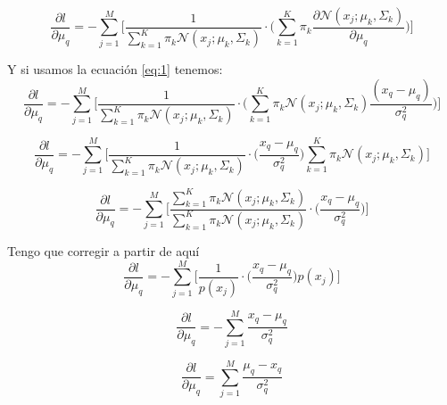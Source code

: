 \documentclass[a5paper]{article}
\begin{document}
\begin{enumerate}
\begin{equation*}
\frac{\partial l}{\partial \mu_q} =
-\sum_{j = 1}^{M} \Bigg[
\frac{1}
{
\sum_{k = 1}^{K} \pi_k \mathcal{N}(x_j; \mu_k, \Sigma_k)
}
\cdot
\Big(
    \sum_{k = 1}^{K} \pi_k
    \frac{\partial \mathcal{N}(x_j; \mu_k, \Sigma_k)}{\partial \mu_q}
\Big)
\Bigg]
\end{equation*}


Y si usamos la ecuación \ref{eq:1} tenemos:
\begin{equation*}
\frac{\partial l}{\partial \mu_q} =
-\sum_{j = 1}^{M} \Bigg[
\frac{1}
{
\sum_{k = 1}^{K} \pi_k \mathcal{N}(x_j; \mu_k, \Sigma_k)
}
\cdot
\Big(
    \sum_{k = 1}^{K} \pi_k
\mathcal{N}(x_j; \mu_k, \Sigma_k)
    \frac{(x_q - \mu_q)}{\sigma_q^2}
\Big)
\Bigg]
\end{equation*}


\begin{equation*}
\frac{\partial l}{\partial \mu_q} =
-\sum_{j = 1}^{M} \Bigg[
\frac{1}
{
\sum_{k = 1}^{K} \pi_k \mathcal{N}(x_j; \mu_k, \Sigma_k)
}
\cdot
\Big(
        \frac{x_q - \mu_q}{\sigma_q^2}
\Big)
    \sum_{k = 1}^{K} \pi_k
    \mathcal{N}(x_j; \mu_k, \Sigma_k)
\Bigg]
\end{equation*}

\begin{equation*}
\frac{\partial l}{\partial \mu_q} =
-\sum_{j = 1}^{M} \Bigg[
\frac
{
\sum_{k = 1}^{K} \pi_k
    \mathcal{N}(x_j; \mu_k, \Sigma_k)
}
{
\sum_{k = 1}^{K} \pi_k \mathcal{N}(x_j; \mu_k, \Sigma_k)
}
\cdot
\Big(
        \frac{x_q - \mu_q}{\sigma_q^2}
\Big)
\Bigg]
\end{equation*}

Tengo que corregir a partir de aquí
\begin{equation*}
\frac{\partial l}{\partial \mu_q} =
-\sum_{j = 1}^{M} \Bigg[
\frac{1}
{
p(x_j)
}
\cdot
\Big(
        \frac{x_q - \mu_q}{\sigma_q^2}
\Big)
    p(x_j)
\Bigg]
\end{equation*}


\begin{equation*}
\frac{\partial l}{\partial \mu_q} =
-\sum_{j = 1}^{M}
        \frac{x_q - \mu_q}{\sigma_q^2}
\end{equation*}

\begin{equation*}
\frac{\partial l}{\partial \mu_q} =
\sum_{j = 1}^{M}
        \frac{\mu_q - x_q}{\sigma_q^2}
\end{equation*}



\end{enumerate}
\end{document}
